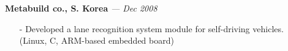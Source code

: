 {\bf Metabuild co., S. Korea}
{\it \footnotesize --- Dec 2008}
\begin{itemize}[leftmargin=*]
\setlength\itemsep{-0.02in}
 \item[-] Developed a lane recognition system module for self-driving vehicles.
          {\small(Linux, C, ARM-based embedded board)}
\end{itemize}

